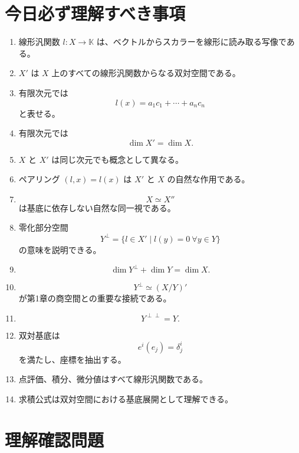 \documentclass[a4paper,11pt]{ltjsarticle}
\newcommand{\K}{\mathbb{K}}
\begin{document}
\section{今日必ず理解すべき事項}

\begin{enumerate}
  \item 線形汎関数 $l:X\to\K$ は、ベクトルからスカラーを線形に読み取る写像である。
  \item $X'$ は $X$ 上のすべての線形汎関数からなる双対空間である。
  \item 有限次元では
  \[
  l(x)=a_1c_1+\cdots+a_nc_n
  \]
  と表せる。
  \item 有限次元では
  \[
  \dim X'=\dim X.
  \]
  \item $X$ と $X'$ は同じ次元でも概念として異なる。
  \item ペアリング $(l,x)=l(x)$ は $X'$ と $X$ の自然な作用である。
  \item
  \[
  X\simeq X''
  \]
  は基底に依存しない自然な同一視である。
  \item 零化部分空間
  \[
  Y^\perp=\{l\in X'\mid l(y)=0\ \forall y\in Y\}
  \]
  の意味を説明できる。
  \item
  \[
  \dim Y^\perp+\dim Y=\dim X.
  \]
  \item
  \[
  Y^\perp\simeq(X/Y)'
  \]
  が第1章の商空間との重要な接続である。
  \item
  \[
  Y^{\perp\perp}=Y.
  \]
  \item 双対基底は
  \[
  e^i(e_j)=\delta^i_j
  \]
  を満たし、座標を抽出する。
  \item 点評価、積分、微分値はすべて線形汎関数である。
  \item 求積公式は双対空間における基底展開として理解できる。
\end{enumerate}

\section{理解確認問題}
\end{document}
